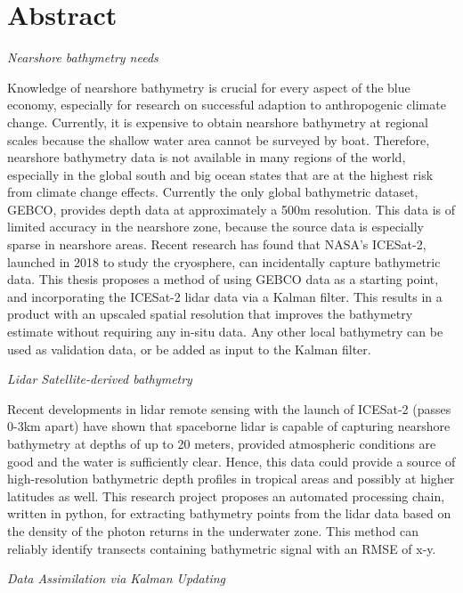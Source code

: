 \chapter*{Abstract}
\noindent\emph{Nearshore bathymetry needs}

Knowledge of nearshore bathymetry is crucial for every aspect of the blue economy, especially for research on successful adaption to anthropogenic climate change. Currently, it is expensive to obtain nearshore bathymetry at regional scales because the shallow water area cannot be surveyed by boat. Therefore, nearshore bathymetry data is not available in many regions of the world, especially in the global south and big ocean states that are at the highest risk from climate change effects. Currently the only global bathymetric dataset, GEBCO, provides depth data at approximately a 500m resolution. This data is of limited accuracy in the nearshore zone, because the source data is especially sparse in nearshore areas. Recent research has found that NASA's ICESat-2, launched in 2018 to study the cryosphere, can incidentally capture bathymetric data. This thesis proposes a method of using GEBCO data as a starting point, and incorporating the ICESat-2 lidar data via a Kalman filter. This results in a product with an upscaled spatial resolution that improves the bathymetry estimate without requiring any in-situ data. Any other local bathymetry can be used as validation data, or be added as input to the Kalman filter. 

\noindent\emph{Lidar Satellite-derived bathymetry}

Recent developments in lidar remote sensing with the launch of ICESat-2 (passes 0-3km apart) have shown that spaceborne lidar is capable of capturing nearshore bathymetry at depths of up to 20 meters, provided atmospheric conditions are good and the water is sufficiently clear. Hence, this data could provide a source of high-resolution bathymetric depth profiles in tropical areas and possibly at higher latitudes as well. This research project proposes an automated processing chain, written in python, for extracting bathymetry points from the lidar data based on the density of the photon returns in the underwater zone. This method can reliably identify transects containing bathymetric signal with an RMSE of x-y. 


\noindent\emph{Data Assimilation via Kalman Updating}

